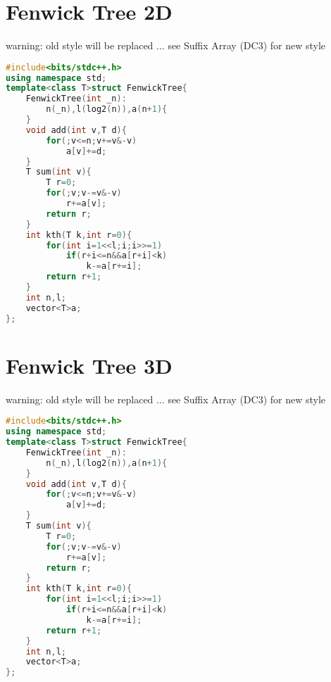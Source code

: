 \documentclass{book}
\begin{document}
\section{Fenwick Tree 2D}
warning: old style will be replaced ... see Suffix Array (DC3) for new style\begin{lstlisting}[language=C++,title={Fenwick Tree 2D.hpp (529 bytes, 25 lines)}]
#include<bits/stdc++.h>
using namespace std;
template<class T>struct FenwickTree{
    FenwickTree(int _n):
        n(_n),l(log2(n)),a(n+1){
    }
    void add(int v,T d){
        for(;v<=n;v+=v&-v)
            a[v]+=d;
    }
    T sum(int v){
        T r=0;
        for(;v;v-=v&-v)
            r+=a[v];
        return r;
    }
    int kth(T k,int r=0){
        for(int i=1<<l;i;i>>=1)
            if(r+i<=n&&a[r+i]<k)
                k-=a[r+=i];
        return r+1;
    }
    int n,l;
    vector<T>a;
};
\end{lstlisting}
\section{Fenwick Tree 3D}
warning: old style will be replaced ... see Suffix Array (DC3) for new style\begin{lstlisting}[language=C++,title={Fenwick Tree 3D.hpp (529 bytes, 25 lines)}]
#include<bits/stdc++.h>
using namespace std;
template<class T>struct FenwickTree{
    FenwickTree(int _n):
        n(_n),l(log2(n)),a(n+1){
    }
    void add(int v,T d){
        for(;v<=n;v+=v&-v)
            a[v]+=d;
    }
    T sum(int v){
        T r=0;
        for(;v;v-=v&-v)
            r+=a[v];
        return r;
    }
    int kth(T k,int r=0){
        for(int i=1<<l;i;i>>=1)
            if(r+i<=n&&a[r+i]<k)
                k-=a[r+=i];
        return r+1;
    }
    int n,l;
    vector<T>a;
};
\end{lstlisting}
\end{document}

